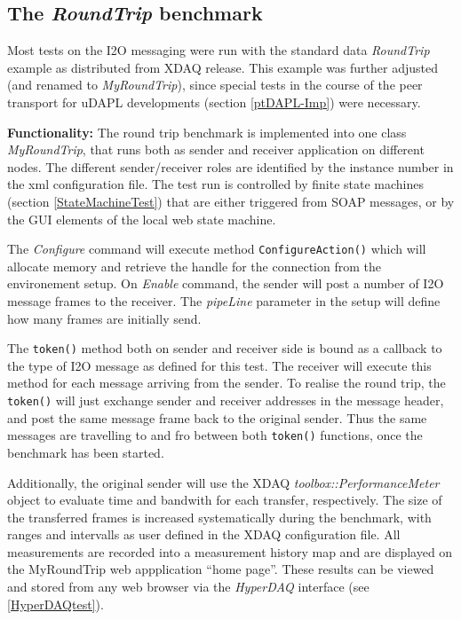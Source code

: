 \subsection{The {\em RoundTrip} benchmark}
\label{RoundTripBasics}

Most tests on the I2O messaging were run with the standard data 
{\em RoundTrip} example as distributed from XDAQ release. This
example was further adjusted (and renamed to {\em MyRoundTrip}), 
since special tests  in the course of the peer transport for 
uDAPL developments (section \ref{ptDAPL-Imp}) were necessary.

{\bf Functionality:}
The round trip benchmark is implemented into one class {\em MyRoundTrip},
that runs both as sender and receiver application on different nodes. The
different sender/receiver roles are identified by 
the instance number in the xml configuration file. The test run is
controlled by finite state machines (section \ref{StateMachineTest}) that
are either triggered from SOAP messages, or by the GUI elements of the
local web state machine.

The {\em Configure} command will execute method {\tt ConfigureAction()} which
will allocate memory and retrieve the handle for the connection from
the environement setup.
On {\em Enable} command, the sender will post a number of I2O message 
frames to the receiver. The {\em pipeLine} parameter in the setup will
define how many frames are initially send.

The {\tt token()} method both on sender and receiver side is bound as a
callback to the type of I2O message as defined for this test.
The receiver will execute this method for each message arriving from
the sender. To realise the round trip, the {\tt token()} will just exchange
sender and receiver addresses in the message header, and post the same
message frame back to the original sender. Thus the same messages are
travelling to and fro between both {\tt token()} functions, once the
benchmark has been started.

Additionally, the original sender will use the XDAQ {\em toolbox::PerformanceMeter} object to evaluate time and bandwith for each transfer, respectively. 
The size of the transferred frames is increased systematically during the
benchmark, with ranges and intervalls as user defined 
in the XDAQ configuration file.
All measurements are recorded into a measurement history map and are
displayed on the MyRoundTrip web appplication ``home page''. These results can
be viewed and stored from any web browser via the {\em HyperDAQ} interface 
(see \ref{HyperDAQtest}). 



